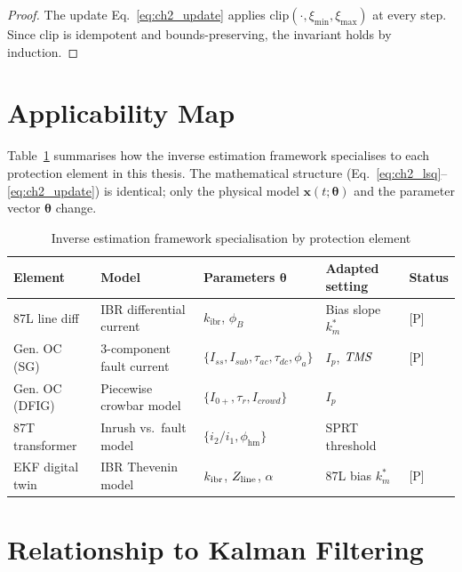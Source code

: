 \begin{proof}
The update Eq.~\eqref{eq:ch2_update} applies $\mathrm{clip}(\cdot,
\xi_\mathrm{min}, \xi_\mathrm{max})$ at every step. Since $\mathrm{clip}$
is idempotent and bounds-preserving, the invariant holds by induction.
\end{proof}

\section{Applicability Map}
\label{sec:ch2_map}

Table~\ref{tab:ch2_applicability} summarises how the inverse estimation
framework specialises to each protection element in this thesis.
The mathematical structure (Eq.~\eqref{eq:ch2_lsq}--\eqref{eq:ch2_update})
is identical; only the physical model $\mathbf{x}(t;\bm{\theta})$ and
the parameter vector $\bm{\theta}$ change.

\begin{table}[htbp]
\caption{Inverse estimation framework specialisation by protection element}
\label{tab:ch2_applicability}
\small
\begin{tabularx}{\textwidth}{@{}lp{2.5cm}p{3.5cm}p{2.5cm}p{2cm}@{}}
\toprule
Element & Model & Parameters $\bm{\theta}$ & Adapted setting & Status \\
\midrule
87L line diff & IBR differential current & $k_\mathrm{ibr}$, $\phi_B$ & Bias slope $k_m^*$ & [P] \\
Gen. OC (SG) & 3-component fault current & $\{I_{ss},I_{sub},\tau_{ac},\tau_{dc},\phi_a\}$ & $I_p$, $\mathit{TMS}$ & [P] \\
Gen. OC (DFIG) & Piecewise crowbar model & $\{I_{0+},\tau_r,I_{crowd}\}$ & $I_p$ \\
87T transformer & Inrush vs.\ fault model & $\{i_2/i_1,\phi_\mathrm{hm}\}$ & SPRT threshold \\
EKF digital twin & IBR Thevenin model & $k_\mathrm{ibr}$, $Z_\mathrm{line}$, $\alpha$ & 87L bias $k_m^*$ & [P] \\
\bottomrule
\end{tabularx}
\end{table}

\section{Relationship to Kalman Filtering}
\label{sec:ch2_ekf_relation}

